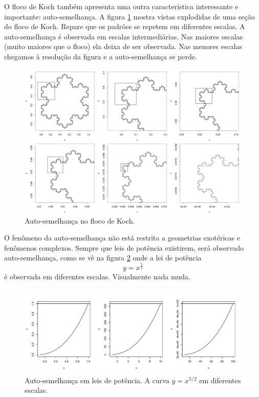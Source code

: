 \documentclass[article,12pt,oneside,a4paper,english,brazil,sumario=tradicional]{abntex2}
\begin{document}
O floco de Koch também apresenta uma outra característica interessante e importante: auto-semelhança. A figura \ref{fig:koch-self} mostra vistas explodidas de uma seção do floco de Koch. Repare que os padrões se repetem em diferentes escalas. A auto-semelhança é observada em escalas intermediárias. Nas maiores escalas (muito maiores que o floco) ela deixa de ser observada. Nas menores escalas chegamos à resolução da figura e a auto-semelhança se perde. 

\begin{figure}
\centering
\includegraphics[width=1\textwidth]{./figuras/koch-self.png}
\caption{Auto-semelhança no floco de Koch.}
\label{fig:koch-self}
\end{figure}


O fenômeno da auto-semelhança não está restrita a geometrias exotéricas e fenômenos complexos. Sempre que leis de potência existirem, será observado auto-semelhança, como se vê na figura \ref{fig:power-law} onde a lei de potência 
\[
y = x^\frac{5}{2}
\]
é observada em diferentes escalas. Visualmente nada muda.

\begin{figure}
\centering
\includegraphics[width=\textwidth]{./figuras/power.pdf}
\caption{Auto-semelhança em leis de potência. A curva $y = x^{5/2}$ em diferentes escalas.}
\label{fig:power-law}
\end{figure}
\end{document}
